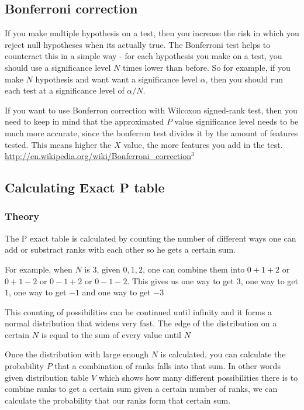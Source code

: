 \documentclass[12pt]{article}
\begin{document}
\subsection{Bonferroni correction}

If you make multiple hypothesis on a test, then you increase the risk in which you reject null hypotheses when its actually true. The Bonferroni test helps to counteract this in a simple way - for each hypothesis you make on a test, you should use a significance level $N$ times lower than before. So for example, if you make $N$ hypothesis and want want a significance level $α$,  then you should run each test at a significance level of $α/N$.

If you want to use Bonferron correction with Wilcoxon signed-rank test, then you need to keep in mind that the approximated $P$ value significance level needs to be much more accurate, since the bonferron test divides it by the amount of features tested. This means higher the $X$ value, the more features you add in the test. \url{http://en.wikipedia.org/wiki/Bonferroni_correction}$^3$

\subsection{Calculating Exact P table}
\subsubsection{Theory}
The P exact table is calculated by counting the number of different ways one can add or substract ranks with each other so he gets a certain sum.

For example, when $N$ is $3$, given ${0, 1, 2}$, one can combine them into $0 + 1 + 2$ or $0 + 1 - 2$ or $0 - 1 + 2$ or $0 - 1 - 2$. This gives us one way to get $3$, one way to get $1$, one way to get $-1$ and one way to get $-3$

This counting of possibilities can be continued until infinity and it forms a normal distribution that widens very fast. The edge of the distribution on a certain $N$ is equal to the sum of every value until $N$

Once the distribution with large enough $N$ is calculated, you can calculate the probability $P$ that a combination of ranks falls into that sum. In other words given distribution table $V$ which shows how many different possibilities there is to combine ranks to get a certain sum given a certain number of ranks, we can calculate the probability that our ranks form that certain sum.
\end{document}
